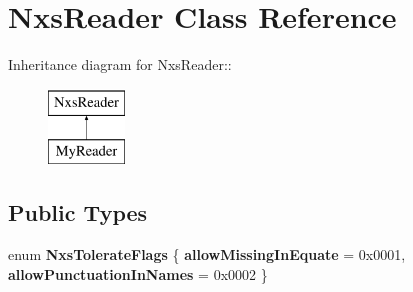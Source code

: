 \hypertarget{classNxsReader}{
\section{NxsReader Class Reference}
\label{classNxsReader}
}
Inheritance diagram for NxsReader::\begin{figure}[H]
\begin{center}
\leavevmode
\includegraphics[height=2cm]{classNxsReader}
\end{center}
\end{figure}
\subsection*{Public Types}
\begin{DoxyCompactItemize}
\item 
enum {\bfseries NxsTolerateFlags} \{ {\bfseries allowMissingInEquate} =  0x0001, 
{\bfseries allowPunctuationInNames} =  0x0002
 \}
\end{DoxyCompactItemize}
